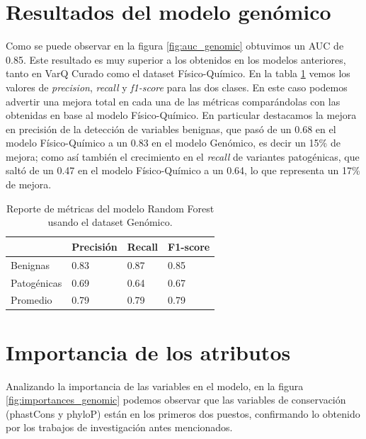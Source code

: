 \section{Resultados del modelo genómico}

Como se puede observar en la figura \ref{fig:auc_genomic} obtuvimos un AUC de 0.85. Este resultado es muy superior a los obtenidos en los modelos anteriores, tanto en VarQ Curado como el dataset Físico-Químico. En la tabla \ref{tab:metrics_genomic} vemos los valores de \textit{precision}, \textit{recall} y \textit{f1-score} para las dos clases. En este caso podemos advertir una mejora total en cada una de las métricas comparándolas con las obtenidas en base al modelo Físico-Químico. En particular destacamos la mejora en precisión de la detección de variables benignas, que pasó de un 0.68 en el modelo Físico-Químico a un 0.83 en el modelo Genómico, es decir un 15\% de mejora; como así también el crecimiento en el \textit{recall} de variantes patogénicas, que saltó de un 0.47 en el modelo Físico-Químico a un 0.64, lo que representa un 17\% de mejora.

\begin{table}[H]
\centering
\begin{tabular}{|l|l|l|l|}
\hline
             & Precisión & Recall & F1-score \\ \hline
Benignas     & 0.83      & 0.87   & 0.85     \\ \hline
Patogénicas  & 0.69      & 0.64   & 0.67     \\ \hline
Promedio     & 0.79      & 0.79   & 0.79     \\ \hline
\end{tabular}
\caption{Reporte de métricas del modelo Random Forest usando el dataset Genómico.}
\label{tab:metrics_genomic}
\end{table}



\section{Importancia de los atributos}
Analizando la importancia de las variables en el modelo, en la figura \ref{fig:importances_genomic} podemos observar que las variables de conservación (phastCons y phyloP) están en los primeros dos puestos, confirmando lo obtenido por los trabajos de investigación antes mencionados. 


